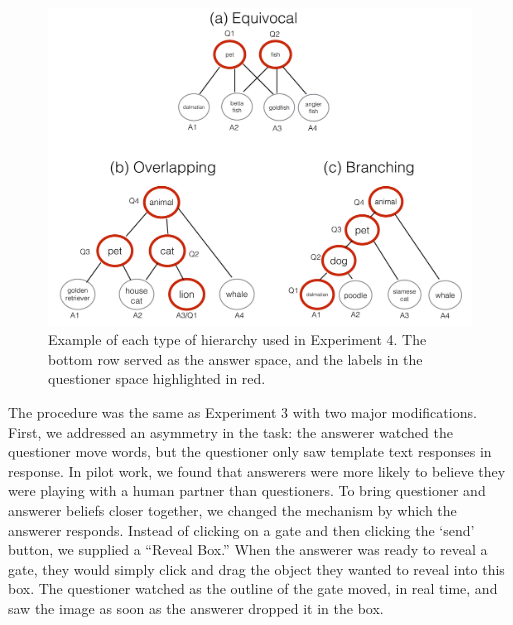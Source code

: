 \documentclass[12pt, floatsintext, jou]{apa6}
\begin{document}
	\begin{figure}[t!]
\begin{center}
\includegraphics[scale = .3]{hierarchyStructureExamples}
\end{center}
\vspace{-.5cm}
\caption{Example of each type of hierarchy used in Experiment 4. The bottom row served as the answer space, and the labels in the questioner space highlighted in red. }
\vspace{-.1cm}
\label{fig:hierarchyStructures}
\end{figure}
The procedure was the same as Experiment 3 with two major modifications. First, we addressed an asymmetry in the task: the answerer watched the questioner move words, but the questioner only saw template text responses in response. In pilot work, we found that answerers were more likely to believe they were playing with a  human partner than questioners. To bring questioner and answerer beliefs closer together, we changed the mechanism by which the answerer responds. Instead of clicking on a gate and then clicking the `send' button, we supplied a ``Reveal Box.'' When the answerer was ready to reveal a gate, they would simply click and drag the object they wanted to reveal into this box. The questioner watched as the outline of the gate moved, in real time, and saw the image as soon as the answerer dropped it in the box. 
\end{document}
